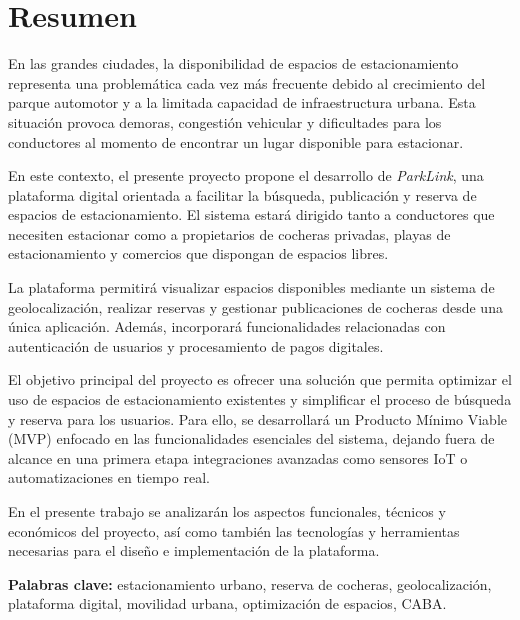 \documentclass[11pt, a4paper]{article}
\begin{document}
\section*{Resumen}
En las grandes ciudades, la disponibilidad de espacios de estacionamiento representa una problemática cada vez más frecuente debido al crecimiento del parque automotor y a la limitada capacidad de infraestructura urbana. Esta situación provoca demoras, congestión vehicular y dificultades para los conductores al momento de encontrar un lugar disponible para estacionar.

En este contexto, el presente proyecto propone el desarrollo de \textit{ParkLink}, una plataforma digital orientada a facilitar la búsqueda, publicación y reserva de espacios de estacionamiento. El sistema estará dirigido tanto a conductores que necesiten estacionar como a propietarios de cocheras privadas, playas de estacionamiento y comercios que dispongan de espacios libres.

La plataforma permitirá visualizar espacios disponibles mediante un sistema de geolocalización, realizar reservas y gestionar publicaciones de cocheras desde una única aplicación. Además, incorporará funcionalidades relacionadas con autenticación de usuarios y procesamiento de pagos digitales.

El objetivo principal del proyecto es ofrecer una solución que permita optimizar el uso de espacios de estacionamiento existentes y simplificar el proceso de búsqueda y reserva para los usuarios. Para ello, se desarrollará un Producto Mínimo Viable (MVP) enfocado en las funcionalidades esenciales del sistema, dejando fuera de alcance en una primera etapa integraciones avanzadas como sensores IoT o automatizaciones en tiempo real.

En el presente trabajo se analizarán los aspectos funcionales, técnicos y económicos del proyecto, así como también las tecnologías y herramientas necesarias para el diseño e implementación de la plataforma.

\vspace{0.5cm}
\textbf{Palabras clave:} estacionamiento urbano, reserva de cocheras, geolocalización, plataforma digital, movilidad urbana, optimización de espacios, CABA.
\newpage
\tableofcontents
\newpage

\end{document}

